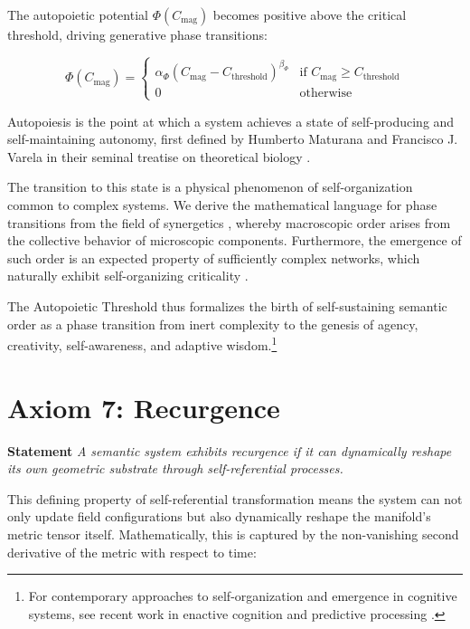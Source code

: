 The autopoietic potential \(\Phi(C_{\text{mag}})\) becomes positive above the critical threshold, driving generative phase transitions:

\begin{equation}
\Phi(C_{\text{mag}}) = \begin{cases}
\alpha_{\Phi} (C_{\text{mag}} - C_{\text{threshold}})^{\beta_{\Phi}} & \text{if } C_{\text{mag}} \geq C_{\text{threshold}} \\
0 & \text{otherwise}
\end{cases}
\end{equation}

Autopoiesis is the point at which a system achieves a state of self-producing and self-maintaining autonomy, first defined by Humberto Maturana and Francisco J. Varela in their seminal treatise on theoretical biology \autocite{MaturanaVarela1980}.

The transition to this state is a physical phenomenon of self-organization common to complex systems. We derive the mathematical language for phase transitions from the field of synergetics \autocite{Haken1983}, whereby macroscopic order arises from the collective behavior of microscopic components. Furthermore, the emergence of such order is an expected property of sufficiently complex networks, which naturally exhibit self-organizing criticality \autocite{BakTangWiesenfeld1987}.

The Autopoietic Threshold thus formalizes the birth of self-sustaining semantic order as a phase transition from inert complexity to the genesis of agency, creativity, self-awareness, and adaptive wisdom.\footnote{For contemporary approaches to self-organization and emergence in cognitive systems, see recent work in enactive cognition \autocite{Thompson2018, DiPaolo2021} and predictive processing \autocite{Clark2016, Hohwy2013}.}


\section{Axiom 7: Recurgence}
\label{1.7:axiom_7_recurgence}

\textbf{Statement} \textit{A semantic system exhibits recurgence if it can dynamically reshape its own geometric substrate through self-referential processes.}

This defining property of self-referential transformation means the system can not only update field configurations but also dynamically reshape the manifold's metric tensor itself. Mathematically, this is captured by the non-vanishing second derivative of the metric with respect to time:

